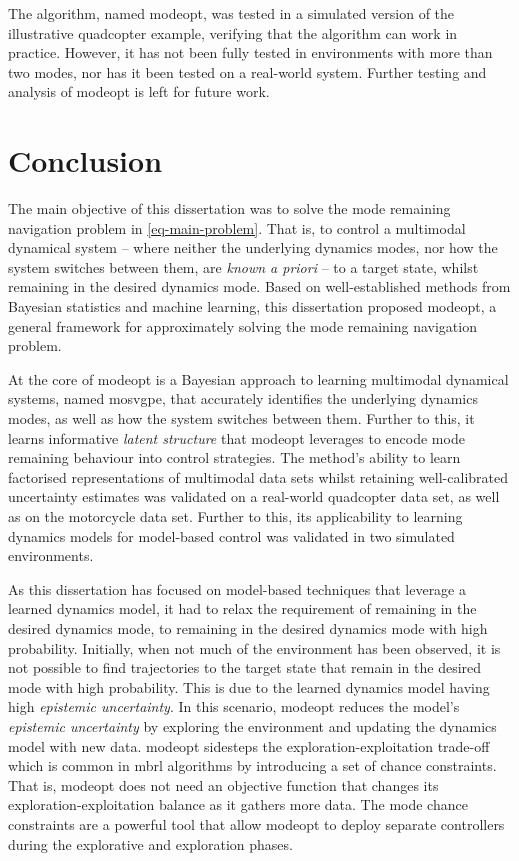 \documentclass{mimosis-class/mimosis}
\numberwithin{equation}{chapter}
\begin{document}
{The algorithm, named \acrshort{modeopt}, was tested in a simulated version of the illustrative quadcopter
example, verifying that the algorithm can work in practice.
However, it has not been fully tested in environments with more than two modes, nor has it been tested
on a real-world system.
Further testing and analysis of \acrshort{modeopt} is left for future work.

\chapter{Conclusion}
\label{sec:org512830c}
The main objective of this dissertation was to solve the mode remaining navigation problem in \cref{eq-main-problem}.
That is, to control a multimodal dynamical system -- where neither the underlying dynamics
modes, nor how the system switches between them, are \emph{known a priori} --
to a target state, whilst remaining in the desired dynamics mode.
Based on well-established methods from Bayesian statistics and machine learning, this dissertation proposed \acrshort{modeopt},
a general framework for approximately solving the mode remaining navigation problem.

At the core of \acrshort{modeopt} is a Bayesian approach to learning multimodal dynamical systems, named \acrfull{mosvgpe},
that accurately identifies the underlying dynamics modes, as well as how the system switches between them.
Further to this, it learns informative \emph{latent structure} that \acrshort{modeopt} leverages to encode mode remaining behaviour
into control strategies.
The method's ability to learn factorised representations of multimodal data sets whilst retaining well-calibrated
uncertainty estimates was validated on a real-world quadcopter data set, as well as on the motorcycle data set.
Further to this, its applicability to learning dynamics models for model-based control
was validated in two simulated environments.

As this dissertation has focused on model-based techniques that leverage a learned dynamics model,
it had to relax the requirement of remaining in the desired dynamics mode,
to remaining in the desired dynamics mode with high probability.
Initially, when not much of the environment has been observed, it is not possible to find trajectories to the target
state that remain in the desired mode with high probability.
This is due to the learned dynamics model having high \emph{epistemic uncertainty}.
In this scenario, \acrshort{modeopt} reduces the model's \emph{epistemic uncertainty} by exploring the environment and
updating the dynamics model with new data.
\acrshort{modeopt} sidesteps the exploration-exploitation trade-off which is common in \acrshort{mbrl} algorithms by
introducing a set of chance constraints.
That is, \acrshort{modeopt} does not need an objective function that changes its exploration-exploitation balance as it gathers
more data.
The mode chance constraints are a powerful tool that allow \acrshort{modeopt} to deploy separate controllers during the
explorative and exploration phases.

}
\end{document}
